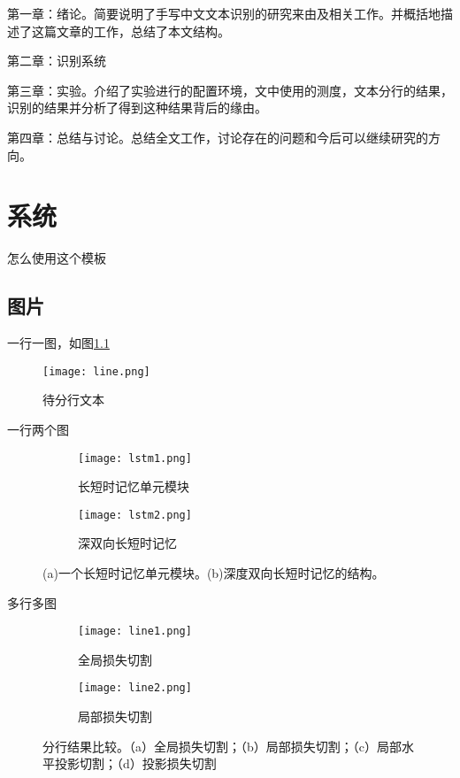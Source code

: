 \documentclass[winfonts, thesis]{njuthesis}
\begin{document}
第一章：绪论。简要说明了手写中文文本识别的研究来由及相关工作。并概括地描述了这篇文章的工作，总结了本文结构。

第二章：识别系统

第三章：实验。介绍了实验进行的配置环境，文中使用的测度，文本分行的结果，识别的结果并分析了得到这种结果背后的缘由。

第四章：总结与讨论。总结全文工作，讨论存在的问题和今后可以继续研究的方向。

\chapter{系统}\label{chapter_system}

怎么使用这个模板

\section{图片}

一行一图，如图\ref{fig:line}
\begin{figure}[htbp]
  \centering
  \texttt{[image: line.png]} %
  \caption{待分行文本}
  \label{fig:line}
\end{figure}


一行两个图
\begin{figure}[ht!]
  \centering
  \begin{subfigure}{.5\textwidth}
    \centering
    \texttt{[image: lstm1.png]}
    \caption{长短时记忆单元模块}
  \end{subfigure}
  \begin{subfigure}{.4\textwidth}
    \centering
    \texttt{[image: lstm2.png]}
    \caption{深双向长短时记忆}
    \label{fig:lstm2}
  \end{subfigure}
  \caption{(a)一个长短时记忆单元模块。(b)深度双向长短时记忆的结构。}
  \label{fig:lstm}
\end{figure}

多行多图
\begin{figure}[ht!]
  \centering
  \begin{subfigure}{\textwidth}
    \centering
    \texttt{[image: line1.png]}
    \caption{全局损失切割}
    \label{fig:line1}
  \end{subfigure}
  \begin{subfigure}{\textwidth}
    \centering
    \texttt{[image: line2.png]}
    \caption{局部损失切割}
    \label{fig:line2}
  \end{subfigure}
  \caption{分行结果比较。（a）全局损失切割；（b）局部损失切割；（c）局部水平投影切割；（d）投影损失切割}
\end{figure}
\end{document}
